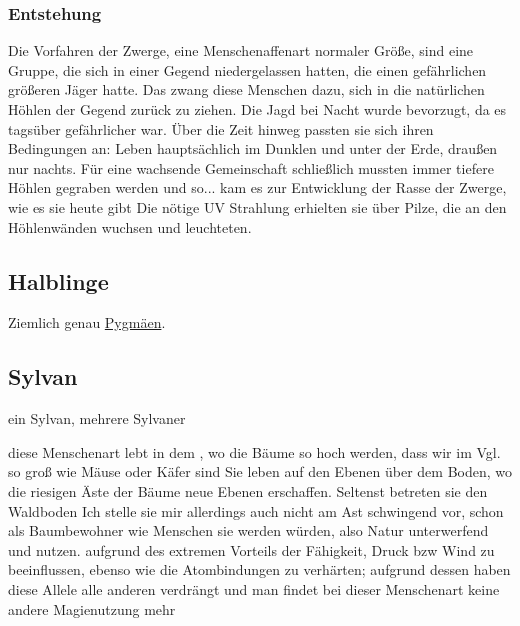 \subsubsection{Entstehung}
Die Vorfahren der Zwerge, eine Menschenaffenart normaler Größe, sind eine Gruppe, die sich in einer Gegend niedergelassen hatten, die einen gefährlichen größeren Jäger hatte. 
Das zwang diese Menschen dazu, sich in die natürlichen Höhlen der Gegend zurück zu ziehen. 
Die Jagd bei Nacht wurde bevorzugt, da es tagsüber gefährlicher war. 
Über die Zeit hinweg passten sie sich ihren Bedingungen an: 
Leben hauptsächlich im Dunklen und unter der Erde, draußen nur nachts. 
Für eine wachsende Gemeinschaft schließlich mussten immer tiefere Höhlen gegraben werden und so... kam es zur Entwicklung der Rasse der Zwerge, wie es sie heute gibt
Die nötige UV Strahlung erhielten sie über Pilze, die an den Höhlenwänden wuchsen und leuchteten.



\subsection{Halblinge} \label{rasse:halbling}
Ziemlich genau \href{https://de.wikipedia.org/wiki/Pygm\%C3\%A4en}{Pygmäen}.


\subsection{Sylvan} \label{rasse:sylvan}
ein Sylvan, mehrere Sylvaner
\begin{outline}
	\1 diese Menschenart lebt in dem , wo die Bäume so hoch werden, dass wir im Vgl. so groß wie Mäuse oder Käfer sind
	\1 Sie leben auf den Ebenen über dem Boden, wo die riesigen Äste der Bäume neue Ebenen erschaffen. Seltenst betreten sie den Waldboden
	\1 Ich stelle sie mir allerdings auch nicht am Ast schwingend vor, schon als Baumbewohner wie Menschen sie werden würden, also Natur unterwerfend und nutzen.
	\1 aufgrund des extremen Vorteils der Fähigkeit, Druck bzw Wind zu beeinflussen, ebenso wie die Atombindungen zu verhärten; aufgrund dessen haben diese Allele alle anderen verdrängt und man findet bei dieser Menschenart keine andere Magienutzung mehr
\end{outline}

